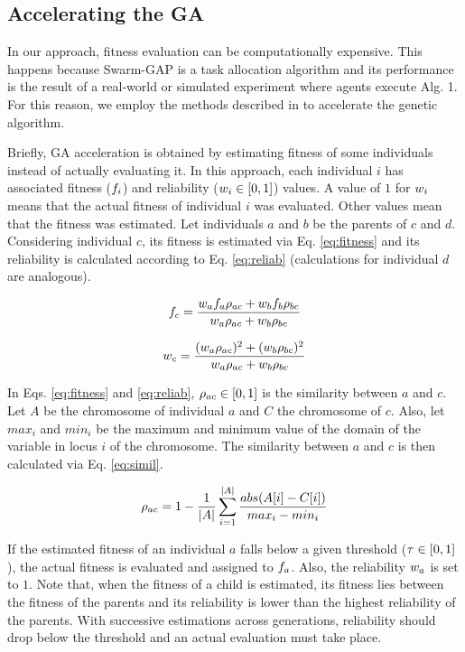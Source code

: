 \documentclass[conference]{IEEEtran}
\begin{document}
\subsection{Accelerating the GA}
In our approach, fitness evaluation can be computationally expensive. This happens because Swarm-GAP is a task allocation algorithm and its performance is the result of a real-world or simulated experiment where agents execute Alg. 1. For this reason, we employ the methods described in \cite{Salami&Hendtlass2003} to accelerate the genetic algorithm. 

Briefly, GA acceleration is obtained by estimating fitness of some individuals instead of actually evaluating it. In this approach, each individual $i$ has associated fitness ($f_{i}$) and reliability ($w_{i} \in [0,1]$) values. A value of $1$ for $w_{i}$ means that the actual fitness of individual $i$ was evaluated. Other values mean that the fitness was estimated. Let individuals $a$ and $b$ be the parents of $c$ and $d$. Considering individual $c$, its fitness is estimated via Eq. \ref{eq:fitness} and its reliability is calculated according to Eq. \ref{eq:reliab} (calculations for individual $d$ are analogous). 

\begin{equation}
\label{eq:fitness}
\fit{c} = \frac{\reliab{a}\fit{a}\simil{a}{c} + \reliab{b}\fit{b}\simil{b}{c}}{\reliab{a}\simil{a}{c} + \reliab{b}\simil{b}{c}}
\end{equation}

\begin{equation}
\label{eq:reliab}
\reliab{c} = \frac{(\reliab{a}\simil{a}{c})^2 + (\reliab{b}\simil{b}{c})^2}{\reliab{a}\simil{a}{c} + \reliab{b}\simil{b}{c}}
\end{equation}

In Eqs. \ref{eq:fitness} and \ref{eq:reliab}, $\rho_{ac} \in [0,1]$ is the similarity between $a$ and $c$. Let $A$ be the chromosome of individual $a$ and $C$ the chromosome of $c$. Also, let $max_i$ and $min_i$ be the maximum and minimum value of the domain of the variable in locus $i$ of the chromosome. The similarity between $a$ and $c$ is then calculated via Eq. \ref{eq:simil}.

\begin{equation}
\label{eq:simil}
\simil{a}{c} = 1 - \frac{1}{|A|} \sum_{i = 1}^{|A|} \frac{abs(A[i] - C[i])}{max_i - min_i}
\end{equation}

If the estimated fitness of an individual $a$ falls below a given threshold ($\tau \in [0,1]$), the actual fitness is evaluated and assigned to $f_{a}$. Also, the reliability $w_{a}$ is set to $1$. Note that, when the fitness of a child is estimated, its fitness lies between the fitness of the parents and its reliability is lower than the highest reliability of the parents. With successive estimations across generations, reliability should drop below the threshold and an actual evaluation must take place.
\end{document}
